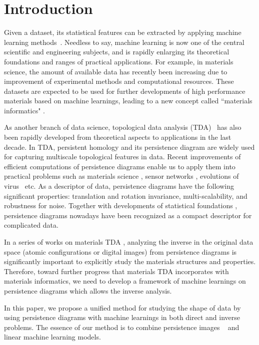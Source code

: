 \documentclass[smallextended]{svjour3}
\begin{document}
\section{Introduction}
\label{sec:intro}
Given a dataset, its statistical features can be extracted by applying machine learning methods~\citep{prml}. 
Needless to say, machine learning is now one of the central scientific and engineering subjects, and is rapidly enlarging its theoretical foundations and ranges of practical applications. 
For example, in materials science, the amount of available data has recently been increasing due to improvement of experimental methods and computational resources. These datasets are expected to be used for further developments of high performance materials based on machine learnings, leading to a new concept called ``materials informatics"  \citep{rajan1,rajan2}.

As another branch of data science, topological data analysis (TDA)~\citep{carlsson,eh} has also been rapidly developed from theoretical aspects to applications in the last decade. In TDA, persistent homology and its persistence diagram \citep{elz,zc} are widely used  for capturing multiscale topological features in data. Recent improvements of efficient computations of persistence diagrams \citep{dipha,phat} enable us to apply them into practical problems such as materials science \citep{amorphous,granular,ichinomiya,iron}, sensor networks \citep{sensor}, evolutions of virus~\citep{virus} etc. 
As a descriptor of data, persistence diagrams have the following significant properties: translation and rotation invariance, multi-scalability, and robustness for noise. Together with developments of statistical foundations \citep{landscape,chazal,fasy,kusano1,kusano2,pssk}, persistence diagrams nowadays have been recognized as a compact descriptor for complicated data. 

In a series of works on materials TDA \citep{amorphous,granular,ichinomiya,iron}, analyzing the inverse in the original data space (atomic configurations or digital images) from persistence diagrams is significantly important to explicitly study the materials structures and properties. Therefore,  toward further progress that materials TDA incorporates with materials informatics, we need to develop a framework of machine learnings on persistence diagrams which allows the inverse analysis.

In this paper, we propose a unified method for studying the shape of data by using persistence diagrams with machine learnings in both direct and inverse problems. The essence of our method is to combine persistence images ~\citep{persistence_image} and linear machine learning models. 
\end{document}
